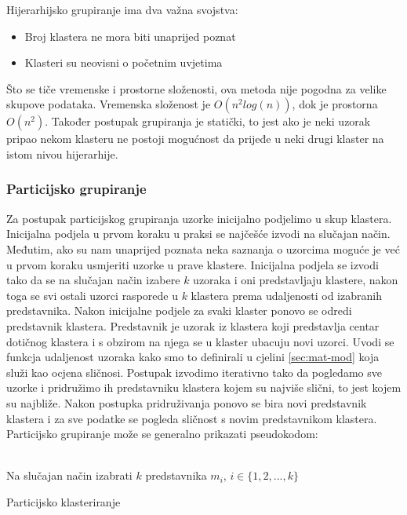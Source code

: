 \documentclass[a4paper,twoside,12pt]{memoir} %
\begin{document}
Hijerarhijsko grupiranje ima dva važna svojstva:
\begin{itemize}
\item Broj klastera ne mora biti unaprijed poznat
\item Klasteri su neovisni o početnim uvjetima
\end{itemize}
Što se tiče vremenske i prostorne složenosti, ova metoda nije pogodna za  velike skupove podataka. Vremenska složenost je $O(n^2log(n))$, dok je prostorna $O(n^2)$. Također postupak grupiranja je statički, to jest ako je neki uzorak pripao nekom klasteru ne postoji mogućnost da prijeđe u neki drugi klaster na istom nivou hijerarhije.
\subsubsection{Particijsko grupiranje}
Za postupak particijskog grupiranja uzorke inicijalno podjelimo u skup klastera. Inicijalna podjela u prvom koraku u praksi se najčešće izvodi na slučajan način. Međutim, ako su nam unaprijed poznata neka saznanja o uzorcima moguće je već u prvom koraku usmjeriti uzorke u prave klastere. Inicijalna podjela se izvodi tako da se na slučajan način izabere $k$ uzoraka i oni predstavljaju klastere, nakon toga se svi ostali uzorci rasporede u $k$ klastera prema udaljenosti od izabranih predstavnika. Nakon inicijalne podjele za svaki klaster ponovo se odredi predstavnik klastera. Predstavnik je uzorak iz klastera koji predstavlja centar dotičnog klastera i s obzirom na njega se u klaster ubacuju novi uzorci. Uvodi se funkcja udaljenost uzoraka kako smo to definirali u cjelini \ref{sec:mat-mod} koja služi kao ocjena sličnosi. Postupak izvodimo iterativno tako da pogledamo sve uzorke i pridružimo ih predstavniku klastera kojem su najviše slični, to jest kojem su najbliže. Nakon postupka pridruživanja ponovo se bira novi predstavnik klastera i za sve podatke se pogleda sličnost s novim predstavnikom klastera. 
Particijsko grupiranje može se generalno prikazati pseudokodom:\\ \\
\begin{algorithm}[H]
 Na slučajan način izabrati $k$ predstavnika $m_i$, $i \in \{1,2,...,k\}$\;
 \caption{Particijsko klasteriranje}
\end{algorithm}
\end{document}
